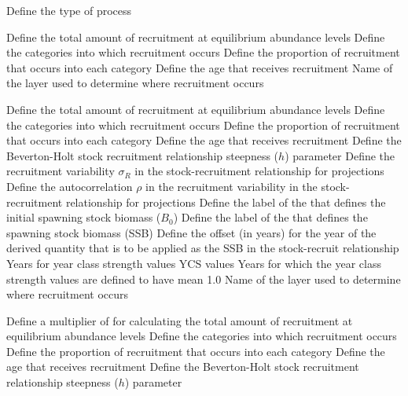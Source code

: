  {Define the type of process}
\par\textbf{}\par
{} {Define the total amount of recruitment at equilibrium abundance levels}
 {Define the categories into which recruitment occurs}
 {Define the proportion of recruitment that occurs into each category}
 {Define the age that receives recruitment}
 {Name of the layer used to determine where recruitment occurs}
\par\textbf{}\par
{} {Define the total amount of recruitment at equilibrium abundance levels}
 {Define the categories into which recruitment occurs}
 {Define the proportion of recruitment that occurs into each category}
 {Define the age that receives recruitment}
 {Define the Beverton-Holt stock recruitment relationship steepness ($h$) parameter}
 {Define the recruitment variability $\sigma_R$ in the stock-recruitment relationship for projections}
 {Define the autocorrelation $\rho$ in the recruitment variability in the stock-recruitment relationship for projections}
 {Define the label of the  that defines the initial spawning stock biomass ($B_0$)}
 {Define the label of the  that defines the spawning stock biomass (SSB)}
 {Define the offset (in years) for the year of the derived quantity that is to be applied as the SSB in the stock-recruit relationship}
 {Years for year class strength values}
 {YCS values}
 {Years for which the year class strength values are defined to have mean 1.0}
 {Name of the layer used to determine where recruitment occurs}
\par\textbf{}\par
{} {Define a multiplier of  for calculating the total amount of recruitment at equilibrium abundance levels}
 {Define the categories into which recruitment occurs}
 {Define the proportion of recruitment that occurs into each category}
 {Define the age that receives recruitment}
 {Define the Beverton-Holt stock recruitment relationship steepness ($h$) parameter}
